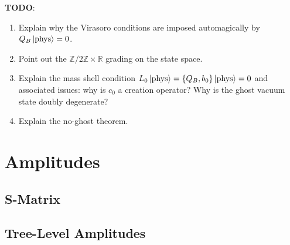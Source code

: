 \documentclass{report}
\theoremstyle{plain}
\theoremstyle{definition}
\theoremstyle{remark}
\newcommand{\bR}{\mathbb{R}}
\newcommand{\bZ}{\mathbb{Z}}
\begin{document}
{\color{blue} \bf TODO}:
\begin{enumerate}
\item Explain why the Virasoro conditions are imposed automagically by
  $Q_B\ket{\text{phys}} = 0$.
\item Point out the $\bZ/2\bZ \times \bR$ grading on the state space.
\item Explain the mass shell condition $L_0\ket{\text{phys}} = \{Q_B,
  b_0\}\ket{\text{phys}} = 0$ and associated issues: why is $c_0$ a
  creation operator? Why is the ghost vacuum state doubly degenerate?
\item Explain the no-ghost theorem.
\end{enumerate}


\chapter{Amplitudes}

\section{S-Matrix}

\section{Tree-Level Amplitudes}
\end{document}
